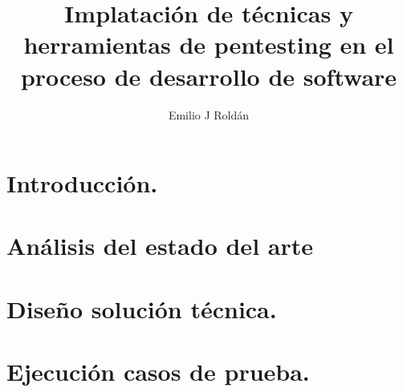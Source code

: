 \documentclass[12pt,a4paper]{report}
\title{Implatación de técnicas y herramientas de pentesting en el proceso de desarrollo de software}
\author{Emilio J Roldán}
\begin{document}
\maketitle
\tableofcontents


\newpage

\chapter{Introducción.}


\chapter{Análisis del estado del arte}
 
 
\chapter{Diseño solución técnica.}


\chapter{Ejecución casos de prueba.}


\newpage
{}
\printbibliography[title=Bibliografia]

\printglossaries
\end{document}
